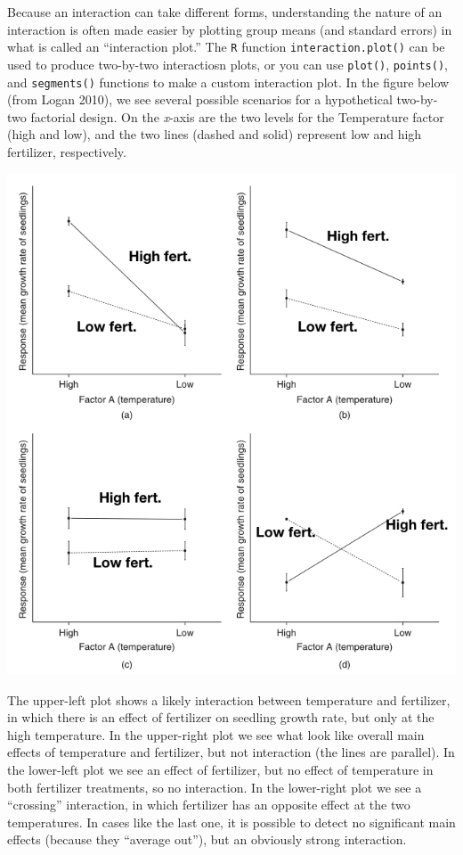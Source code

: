 \documentclass[
]{book}
\begin{document}
Because an interaction can take different forms, understanding the nature of an interaction is often made easier by plotting group means (and standard errors) in what is called an ``interaction plot.'' The \texttt{R} function \texttt{interaction.plot()} can be used to produce two-by-two interactiosn plots, or you can use \texttt{plot()}, \texttt{points()}, and \texttt{segments()} functions to make a custom interaction plot. In the figure below (from Logan 2010), we see several possible scenarios for a hypothetical two-by-two factorial design. On the \emph{x}-axis are the two levels for the Temperature factor (high and low), and the two lines (dashed and solid) represent low and high fertilizer, respectively.

\begin{center}\includegraphics[width=0.75\linewidth]{images/images_7a.022} \end{center}

The upper-left plot shows a likely interaction between temperature and fertilizer, in which there is an effect of fertilizer on seedling growth rate, but only at the high temperature. In the upper-right plot we see what look like overall main effects of temperature and fertilizer, but not interaction (the lines are parallel). In the lower-left plot we see an effect of fertilizer, but no effect of temperature in both fertilizer treatments, so no interaction. In the lower-right plot we see a ``crossing'' interaction, in which fertilizer has an opposite effect at the two temperatures. In cases like the last one, it is possible to detect no significant main effects (because they ``average out''), but an obviously strong interaction.
\end{document}
